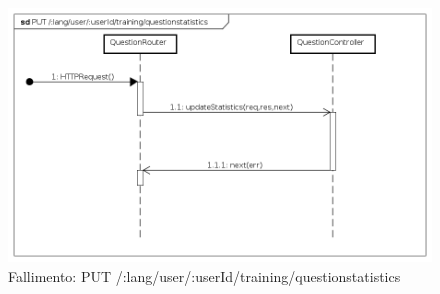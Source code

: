 \begin{itemize}
\begin{figure}[ht]
	\centering
	\includegraphics[scale=0.45]{UML/DiagrammiDiSequenza/Back-end/PUT__lang_user__userId_training_questionstatistics_failure.png}
	\caption{Fallimento: PUT /:lang/user/:userId/training/questionstatistics}
\end{figure}
\FloatBarrier

\end{itemize} 







